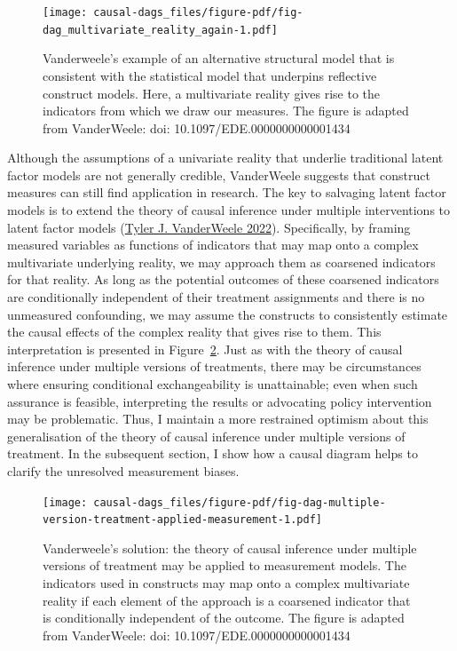 \documentclass[
  singlecolumn]{article}
\begin{document}
\begin{figure}

{\centering \texttt{[image: causal-dags\_files/figure-pdf/fig-dag\_multivariate\_reality\_again-1.pdf]}

}

\caption{\label{fig-dag_multivariate_reality_again}Vanderweele's example
of an alternative structural model that is consistent with the
statistical model that underpins reflective construct models. Here, a
multivariate reality gives rise to the indicators from which we draw our
measures. The figure is adapted from VanderWeele: doi:
10.1097/EDE.0000000000001434}

\end{figure}

Although the assumptions of a univariate reality that underlie
traditional latent factor models are not generally credible, VanderWeele
suggests that construct measures can still find application in research.
The key to salvaging latent factor models is to extend the theory of
causal inference under multiple interventions to latent factor models
(\protect\hyperlink{ref-vanderweele2022}{Tyler J. VanderWeele 2022}).
Specifically, by framing measured variables as functions of indicators
that may map onto a complex multivariate underlying reality, we may
approach them as coarsened indicators for that reality. As long as the
potential outcomes of these coarsened indicators are conditionally
independent of their treatment assignments and there is no unmeasured
confounding, we may assume the constructs to consistently estimate the
causal effects of the complex reality that gives rise to them. This
interpretation is presented in
Figure~\ref{fig-dag-multiple-version-treatment-applied-measurement}.
Just as with the theory of causal inference under multiple versions of
treatments, there may be circumstances where ensuring conditional
exchangeability is unattainable; even when such assurance is feasible,
interpreting the results or advocating policy intervention may be
problematic. Thus, I maintain a more restrained optimism about this
generalisation of the theory of causal inference under multiple versions
of treatment. In the subsequent section, I show how a causal diagram
helps to clarify the unresolved measurement biases.

\begin{figure}

{\centering \texttt{[image: causal-dags\_files/figure-pdf/fig-dag-multiple-version-treatment-applied-measurement-1.pdf]}

}

\caption{\label{fig-dag-multiple-version-treatment-applied-measurement}Vanderweele's
solution: the theory of causal inference under multiple versions of
treatment may be applied to measurement models. The indicators used in
constructs may map onto a complex multivariate reality if each element
of the approach is a coarsened indicator that is conditionally
independent of the outcome. The figure is adapted from VanderWeele: doi:
10.1097/EDE.0000000000001434}

\end{figure}
\end{document}
